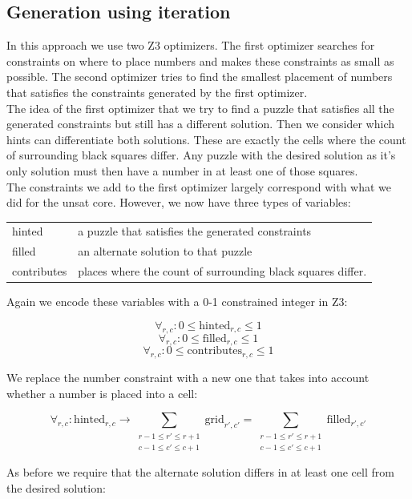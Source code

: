 \documentclass{scrartcl}
\begin{document}
	\subsection{Generation using iteration} %
	\label{sub:mosaic_iteration}
	In this approach we use two Z3 optimizers.
	The first optimizer searches for constraints on where to place numbers and makes these constraints as small as possible.
	The second optimizer tries to find the smallest placement of numbers that satisfies the constraints generated by the first optimizer.\\

	The idea of the first optimizer that we try to find a puzzle that satisfies all the generated constraints but still has a different solution. Then we consider which hints can differentiate both solutions. These are exactly the cells where the count of surrounding black squares differ.
	Any puzzle with the desired solution as it's only solution must then have a number in at least one of those squares.\\

	The constraints we add to the first optimizer largely correspond with what we did for the unsat core. However, we now have three types of variables:

	\begin{tabular}{ll}
		hinted & a puzzle that satisfies the generated constraints\\
		filled & an alternate solution to that puzzle\\
		contributes & places where the count of surrounding black squares differ.
	\end{tabular}

	Again we encode these variables with a 0-1 constrained integer in Z3:

	$$\forall_{r,c}: 0\le \text{hinted}_{r,c} \le 1$$
	$$\forall_{r,c}: 0\le \text{filled}_{r,c} \le 1$$
	$$\forall_{r,c}: 0\le \text{contributes}_{r,c} \le 1$$

	We replace the number constraint with a new one that takes into account whether a number is placed into a cell:

	$$\forall_{r,c}: \text{hinted}_{r,c}\to\sum_{\substack{r-1\le r' \le r+1\\c-1\le c'\le c+1}}\text{grid}_{r',c'} = \sum_{\substack{r-1\le r' \le r+1\\c-1\le c'\le c+1}}\text{filled}_{r',c'}$$

	As before we require that the alternate solution differs in at least one cell from the desired solution:
\end{document}
